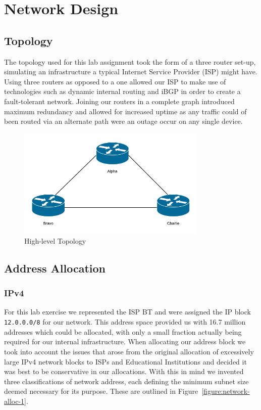 \chapter{Network Design}

\section{Topology}

The topology used for this lab assignment took the form of a three router set-up, 
simulating an infrastructure a typical Internet Service Provider (ISP)
might have. Using three routers as opposed to a one allowed our ISP to make
use of technologies such as dynamic internal routing and iBGP in order to
create a fault-tolerant network. Joining our routers in a complete graph
introduced maximum redundancy and allowed for increased uptime as any traffic
could of been routed via an alternate path were an outage occur on any single
device.

\begin{figure}[!ht]
    \caption{High-level Topology}
    \centering
    \includegraphics[width=0.8\textwidth]{images/networkTopology.png}
\end{figure}

\section{Address Allocation}
\subsection{IPv4}
For this lab exercise we represented the ISP BT and were assigned the IP block
\texttt{12.0.0.0/8} for our network. This address space provided us with 16.7
million addresses which could be allocated, with only a small fraction actually
being required for our internal infrastructure. When allocating our address
block we took into account the issues that arose from the original allocation
of excessively large IPv4 network blocks to ISPs and Educational Institutions
and decided it was best to be conservative in our allocations. With this in
mind we invented three classifications of network address, each defining the
minimum subnet size deemed necessary for its purpose. These are outlined in
Figure~\ref{figure:network-alloc-1}.

